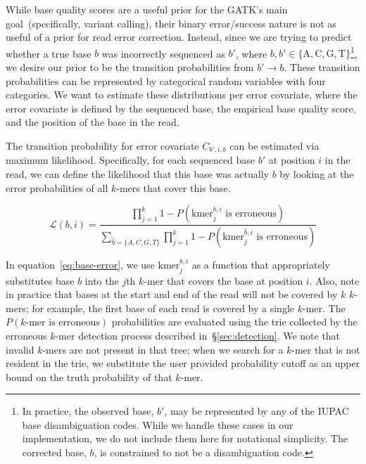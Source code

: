 \documentclass{llncs}
\begin{document}
While base quality scores are a useful prior for the GATK's main goal~(specifically, variant calling),
their binary error/success nature is not as useful of a prior for read error correction. Instead, since we
are trying to predict whether a true base $b$ was incorrectly sequenced as $b'$, where $b, b' \in
\{ \text{A}, \text{C}, \text{G}, \text{T} \}$\footnote{In practice, the observed base, $b'$, may be
represented by any of the IUPAC base disambiguation codes. While we handle these cases in our
implementation, we do not include them here for notational simplicity. The corrected base, $b$, is
constrained to not be a disambiguation code.}, we desire our prior to be the transition probabilities from
$b' \rightarrow b$. These transition probabilities can be represented by categorical random variables
with four categories. We want to estimate these distributions per error covariate, where the error
covariate is defined by the sequenced base, the empirical base quality score, and the position of the
base in the read.

The transition probability for error covariate $C_{b', i, b}$ can be estimated via maximum likelihood.
Specifically, for each sequenced base $b'$ at position $i$ in the read, we can define the likelihood that
this base was actually $b$ by looking at the error probabilities of all $k$-mers that cover this base.

\begin{equation}
\label{eq:base-error}
\mathcal{L}(b, i) = \frac{\prod_{j = 1}^{k} 1 - P(\text{kmer}_j^{b, i} \text{ is erroneous})}{\sum_{\hat{b} =
\{A, C, G, T\}} \prod_{j = 1}^{k} 1 - P(\text{kmer}_j^{\hat{b}, i} \text{ is erroneous})}
\end{equation}

In equation~\ref{eq:base-error}, we use $\text{kmer}_j^{b, i}$ as a function that appropriately
substitutes base $b$ into the $j$th $k$-mer that covers the base at position $i$. Also, note in practice
that bases at the start and end of the read will not be covered by $k$ $k$-mers; for example, the first
base of each read is covered by a single $k$-mer. The $P(k\text{-mer is erroneous})$ probabilities
are evaluated using the trie collected by the erroneous $k$-mer detection process described
in~\S\ref{sec:detection}. We note that invalid $k$-mers are not present in that tree; when we search for
a $k$-mer that is not resident in the trie, we substitute the user provided probability cutoff as an upper
bound on the truth probability of that $k$-mer.
\end{document}
